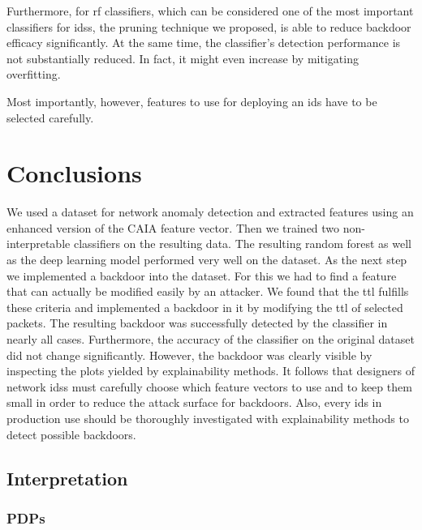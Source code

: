 \documentclass[10pt,sigconf,letterpaper,dvipsnames]{acmart}
\begin{document}
Furthermore, for \gls{rf} classifiers, which can be considered one of the most important classifiers for \glspl{ids}, the pruning technique we proposed, is able to reduce backdoor efficacy significantly. At the same time, the classifier's detection performance is not substantially reduced. In fact, it might even increase by mitigating overfitting.

Most importantly, however, features to use for deploying an \gls{ids} have to be selected carefully.

\section{Conclusions}

We used a dataset for network anomaly detection and extracted features using an enhanced version of the CAIA feature vector. Then we trained two non-interpretable classifiers on the resulting data. The resulting random forest as well as the deep learning model performed very well on the dataset. As the next step we implemented a backdoor into the dataset. For this we had to find a feature that can actually be modified easily by an attacker. We found that the \gls{ttl} fulfills these criteria and implemented a backdoor in it by modifying the  \gls{ttl} of selected packets. The resulting backdoor was successfully detected by the classifier in nearly all cases. Furthermore, the accuracy of the classifier on the original dataset did not change significantly. However, the backdoor was clearly visible by inspecting the plots yielded by explainability methods. It follows that designers of network \glspl{ids} must carefully choose which feature vectors to use and to keep them small in order to reduce the attack surface for backdoors. Also, every \gls{ids} in production use should be thoroughly investigated with explainability methods to detect possible backdoors.




\subsection{Interpretation}
\subsubsection{PDPs}
\end{document}
